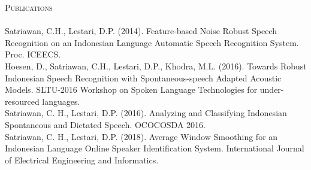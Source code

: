 \documentclass[a4paper]{article}
\newcommand{\lineunder} {
    \vspace*{-8pt} \\
    \hspace*{-18pt} \hrulefill \\
}
\newcommand{\header} [1] {
    {\hspace*{-18pt}\vspace*{6pt} \textsc{#1}}
    \vspace*{-6pt} \lineunder
}
\begin{document}
\header{Publications}
\vspace{2mm}
Satriawan, C.H., Lestari, D.P. (2014). Feature-based Noise Robust Speech Recognition on an Indonesian Language Automatic Speech Recognition System.
Proc. ICEECS.\\
\vspace*{3mm}
Hoesen, D., Satriawan, C.H., Lestari, D.P., Khodra, M.L. (2016). Towards Robust Indonesian Speech Recognition with Spontaneous-speech Adapted Acoustic Models.
SLTU-2016 Workshop on Spoken Language Technologies for under-resourced
languages.\\
\vspace*{3mm}
Satriawan, C. H., Lestari, D.P. (2016). Analyzing and Classifying Indonesian Spontaneous and Dictated Speech. OCOCOSDA 2016.\\
\vspace*{3mm}
Satriawan, C. H., Lestari, D.P. (2018). Average Window Smoothing for an
Indonesian Language Online Speaker Identification System.
International Journal of Electrical Engineering and Informatics.\\

\ 
\end{document}
